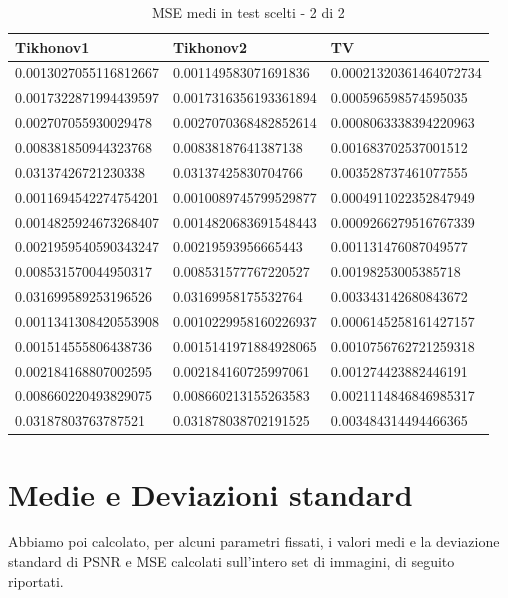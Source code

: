 \documentclass[12pt]{article}
\begin{document}
    \begin{table}[!ht]
    \centering
    \begin{tabular}{|l|l|l|}
    \hline
        Tikhonov1 & Tikhonov2 & TV \\ \hline
        0.0013027055116812667 & 0.001149583071691836 & 0.00021320361464072734 \\ \hline
        0.0017322871994439597 & 0.0017316356193361894 & 0.000596598574595035 \\ \hline
        0.002707055930029478 & 0.0027070368482852614 & 0.0008063338394220963 \\ \hline
        0.008381850944323768 & 0.00838187641387138 & 0.001683702537001512 \\ \hline
        0.03137426721230338 & 0.03137425830704766 & 0.003528737461077555 \\ \hline
        0.0011694542274754201 & 0.0010089745799529877 & 0.0004911022352847949 \\ \hline
        0.0014825924673268407 & 0.0014820683691548443 & 0.0009266279516767339 \\ \hline
        0.0021959540590343247 & 0.00219593956665443 & 0.001131476087049577 \\ \hline
        0.008531570044950317 & 0.008531577767220527 & 0.00198253005385718 \\ \hline
        0.031699589253196526 & 0.03169958175532764 & 0.003343142680843672 \\ \hline
        0.0011341308420553908 & 0.0010229958160226937 & 0.0006145258161427157 \\ \hline
        0.001514555806438736 & 0.0015141971884928065 & 0.0010756762721259318 \\ \hline
        0.002184168807002595 & 0.002184160725997061 & 0.001274423882446191 \\ \hline
        0.008660220493829075 & 0.008660213155263583 & 0.0021114846846985317 \\ \hline
        0.03187803763787521 & 0.031878038702191525 & 0.003484314494466365 \\ \hline
    \end{tabular}
    \caption{MSE medi in test scelti - 2 di 2}
    \label{table:5}
    \end{table}
    \newpage

\section{Medie e Deviazioni standard}
    Abbiamo poi calcolato, per alcuni parametri fissati, i valori medi e la deviazione standard di PSNR e MSE calcolati sull'intero set di immagini, di seguito riportati.
    
\end{document}
